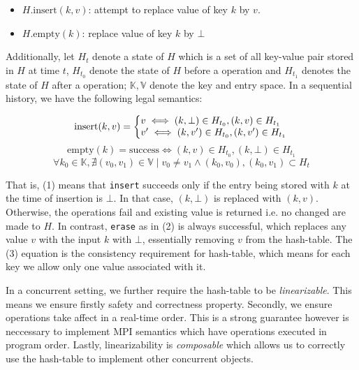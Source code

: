 \documentclass{sig-alternate-05-2015}
\begin{document}
\begin{itemize}
  \item $H.\text{insert}(k,v)$: attempt to replace value of key $k$ by $v$.
  \item $H.\text{empty}(k)$: replace value of key $k$ by $\bot$
\end{itemize}

Additionally, let $H_t$ denote a state of $H$ which is a set of all key-value
pair stored in $H$ at time $t$, $H_{t_0}$ denote the state of $H$ before a
operation and $H_{t_1}$ denotes the state of $H$ after a operation;
$\mathbb{K}, \mathbb{V}$ denote the key and entry space. In a sequential
history, we have the following legal semantics:

\begin{equation}
  \text{insert}(k, v) = \left\{
    \begin{array}{@{}l@{\thinspace}l}
      v \iff (k,\bot) \in H_{t_0}, (k,v) \in H_{t_1}\\
      v' \iff (k,v') \in H_{t_0}, (k,v') \in H_{t_1}
    \end{array}
    \right.
\end{equation}
\begin{equation}
  \text{empty}(k) = \text{success} \iff  (k,v) \in H_{t_0}, (k,\bot) \in H_{t_1}
\end{equation}
\begin{equation}
  \forall k_0 \in \mathbb{K}, \nexists {(v_0, v_1) \in \mathbb{V}}
  \mid {{v_0 \ne v_1} \wedge {(k_0, v_0), (k_0, v_1)} \subset H_{t}}
\end{equation}

That is, (1) means that \texttt{insert} succeeds only if the entry being stored
with $k$ at the time of insertion is $\bot$.  In that case, $(k,\bot)$ is
replaced with $(k, v)$. Otherwise, the operations fail and existing value is
returned i.e. no changed are made to $H$. In contrast, \texttt{erase} as in (2)
is always successful, which replaces any value $v$ with the input $k$ with
$\bot$, essentially removing $v$ from the hash-table. The (3) equation is the
consistency requirement for hash-table, which means for each key we allow
only one value associated with it.

In a concurrent setting, we further require the hash-table to be
\textit{linearizable}.  This means we ensure firstly safety and correctness
property. Secondly, we ensure operations take affect in a real-time order.
This is a strong guarantee however is neccessary to implement MPI semantics
which have operations executed in program order. Lastly, linearizability is
\textit{composable} which allows us to correctly use the hash-table to
implement other concurrent objects.
\end{document}
